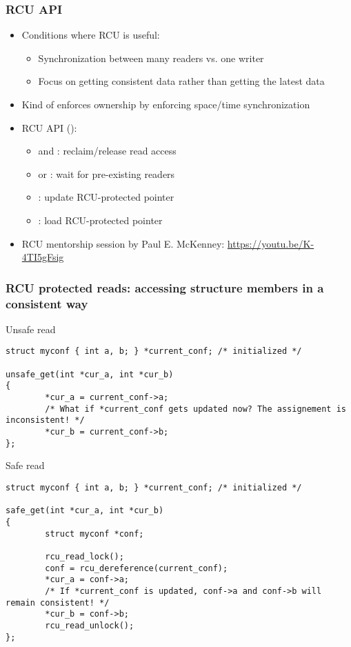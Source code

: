\begin{frame}[fragile]
  \frametitle{RCU API}
  \begin{itemize}
  \item Conditions where RCU is useful:
    \begin{itemize}
    \item Synchronization between many readers vs. one writer
    \item Focus on getting consistent data rather than getting the
      latest data
    \end{itemize}
  \item Kind of enforces ownership by enforcing space/time synchronization
  \item RCU API ():
    \begin{itemize}
    \item {} and :
      reclaim/release read access
    \item {} or : wait for
      pre-existing readers
    \item {}: update RCU-protected pointer
    \item {}: load RCU-protected pointer
    \end{itemize}
  \item RCU mentorship session by Paul E. McKenney:
    \url{https://youtu.be/K-4TI5gFsig}
  \end{itemize}
\end{frame}

\begin{frame}[fragile]
  \frametitle{RCU protected reads: accessing structure members in a consistent way}
    \begin{block}{Unsafe read}
      \begin{verbatim}
struct myconf { int a, b; } *current_conf; /* initialized */

unsafe_get(int *cur_a, int *cur_b)
{
        *cur_a = current_conf->a;
        /* What if *current_conf gets updated now? The assignement is inconsistent! */
        *cur_b = current_conf->b;
};
      \end{verbatim}
    \end{block}
  \begin{block}{Safe read}
    \begin{verbatim}
struct myconf { int a, b; } *current_conf; /* initialized */

safe_get(int *cur_a, int *cur_b)
{
        struct myconf *conf;

        rcu_read_lock();
        conf = rcu_dereference(current_conf);
        *cur_a = conf->a;
        /* If *current_conf is updated, conf->a and conf->b will remain consistent! */
        *cur_b = conf->b;
        rcu_read_unlock();
};
    \end{verbatim}
  \end{block}
\end{frame}

